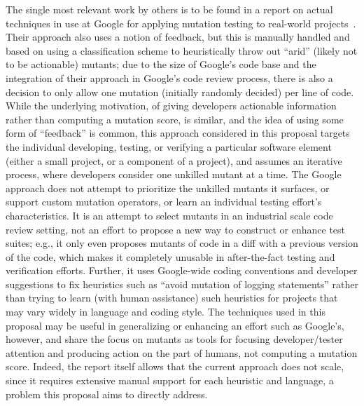 The single most relevant work by others is to be found in a
report on actual techniques in use at Google for applying mutation
testing to real-world projects~\cite{MutGoogle}.  Their approach also
uses a notion of feedback, but this is manually handled and based on
using a classification scheme to heuristically throw out ``arid''
(likely not to be actionable)
mutants; due to the size of Google's code base and the integration of
their approach in Google's code review process, there is also a
decision to only allow one mutation (initially randomly decided) per
line of code.  While the underlying motivation, of giving developers
actionable information rather than computing a mutation score, is
similar, and the idea of using some form of ``feedback'' is common,
this approach considered in this proposal targets the individual developing, testing, or verifying a particular software
element (either a small project, or a component of a project), and
assumes an iterative process, where developers consider one unkilled
mutant at a time.  The Google approach does not attempt to prioritize
the unkilled mutants it surfaces, or support custom mutation
operators, or learn an individual testing effort's characteristics.
It is an attempt to select mutants
in an industrial scale code review setting, not an effort to propose a
new way to construct or enhance test suites; e.g., it only even
proposes mutants of code in a diff with a previous version of the
code, which makes it completely unusable in after-the-fact testing and
verification efforts.  Further, it uses
Google-wide coding conventions and developer suggestions to fix
heuristics such as ``avoid mutation of logging statements'' rather
than trying to learn (with human assistance) such heuristics for
projects that may vary widely in language and coding style.  
The techniques used in this proposal may be useful in generalizing or enhancing an
effort such as Google's, however, and share the focus on mutants as
tools for focusing developer/tester attention and producing action on the
part of humans, not computing a mutation score.  Indeed, the report
itself allows that the current approach does not scale, since it
requires extensive manual support for each heuristic and language, a
problem this proposal aims to directly address.


